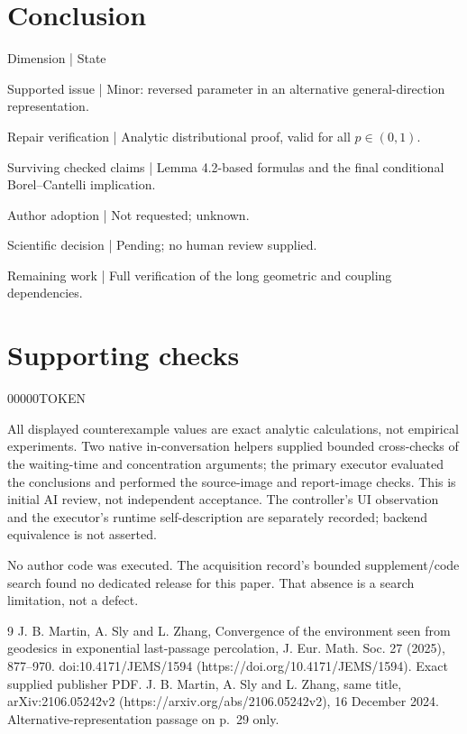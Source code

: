 \documentclass[10pt]{article}
\begin{document}
\section*{Conclusion}
Dimension | State\par
Supported issue | Minor: reversed parameter in an alternative general-direction representation.\par
Repair verification | Analytic distributional proof, valid for all \(p\in(0,1)\).\par
Surviving checked claims | Lemma 4.2-based formulas and the final conditional Borel–Cantelli implication.\par
Author adoption | Not requested; unknown.\par
Scientific decision | Pending; no human review supplied.\par
Remaining work | Full verification of the long geometric and coupling dependencies.\par
\section*{Supporting checks}
00000TOKEN\par
All displayed counterexample values are exact analytic calculations, not empirical experiments. Two native in-conversation helpers supplied bounded cross-checks of the waiting-time and concentration arguments; the primary executor evaluated the conclusions and performed the source-image and report-image checks. This is initial AI review, not independent acceptance. The controller’s UI observation and the executor’s runtime self-description are separately recorded; backend equivalence is not asserted.\par
No author code was executed. The acquisition record’s bounded supplement/code search found no dedicated release for this paper. That absence is a search limitation, not a defect.\par
9 J. B. Martin, A. Sly and L. Zhang, Convergence of the environment seen from geodesics in exponential last-passage percolation, J. Eur. Math. Soc. 27 (2025), 877–970. doi:10.4171/JEMS/1594 (https://doi.org/10.4171/JEMS/1594). Exact supplied publisher PDF. J. B. Martin, A. Sly and L. Zhang, same title, arXiv:2106.05242v2 (https://arxiv.org/abs/2106.05242v2), 16 December 2024. Alternative-representation passage on p. 29 only.\par
\end{document}
